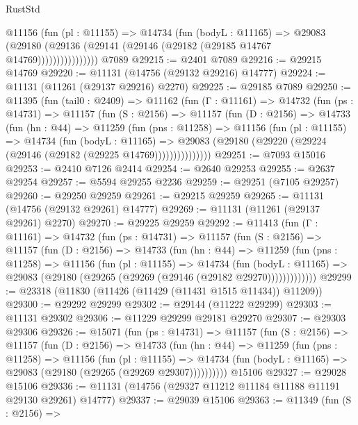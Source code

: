 \begin{lexlean}{RustStd}
\begin{coremodule}
                  @11156
                    (fun (pl : @11155) =>
                    @14734
                      (fun (bodyL : @11165) =>
                      @29083
                        (@29180
                          (@29136 (@29141 (@29146 (@29182 (@29185 @14767 @14769))))))))))))))))
    @7089
@29215 := @2401 @7089
@29216 := @29215 @14769
@29220 := @11131 (@14756 (@29132 @29216) @14777)
@29224 := @11131 (@11261 (@29137 @29216) @2270)
@29225 := @29185 @7089
@29250 := @11395
    (fun (tail0 : @2409) =>
    @11162
      (fun (Γ : @11161) =>
      @14732
        (fun (ps : @14731) =>
        @11157
          (fun (S : @2156) =>
          @11157
            (fun (D : @2156) =>
            @14733
              (fun (hn : @44) =>
              @11259
                (fun (pns : @11258) =>
                @11156
                  (fun (pl : @11155) =>
                  @14734
                    (fun (bodyL : @11165) =>
                    @29083 (@29180 (@29220 (@29224 (@29146 (@29182 (@29225 @14769)))))))))))))))
@29251 := @7093 @15016
@29253 := @2410 @7126 @2414
@29254 := @2640 @29253
@29255 := @2637 @29254
@29257 := @5594 @29255 @2236
@29259 := @29251 (@7105 @29257)
@29260 := @29250 @29259
@29261 := @29215 @29259
@29265 := @11131 (@14756 (@29132 @29261) @14777)
@29269 := @11131 (@11261 (@29137 @29261) @2270)
@29270 := @29225 @29259
@29292 := @11413
    (fun (Γ : @11161) =>
    @14732
      (fun (ps : @14731) =>
      @11157
        (fun (S : @2156) =>
        @11157
          (fun (D : @2156) =>
          @14733
            (fun (hn : @44) =>
            @11259
              (fun (pns : @11258) =>
              @11156
                (fun (pl : @11155) =>
                @14734
                  (fun (bodyL : @11165) =>
                  @29083 (@29180 (@29265 (@29269 (@29146 (@29182 @29270)))))))))))))
@29299 := @23318 (@11830 (@11426 (@11429 (@11431 @1515 @11434)) @11209))
@29300 := @29292 @29299
@29302 := @29144 (@11222 @29299)
@29303 := @11131 @29302
@29306 := @11229 @29299 @29181 @29270
@29307 := @29303 @29306
@29326 := @15071
    (fun (ps : @14731) =>
    @11157
      (fun (S : @2156) =>
      @11157
        (fun (D : @2156) =>
        @14733
          (fun (hn : @44) =>
          @11259
            (fun (pns : @11258) =>
            @11156
              (fun (pl : @11155) =>
              @14734 (fun (bodyL : @11165) => @29083 (@29180 (@29265 (@29269 @29307))))))))))
    @15106
@29327 := @29028 @15106
@29336 := @11131 (@14756 (@29327 @11212 @11184 @11188 @11191 @29130 @29261) @14777)
@29337 := @29039 @15106
@29363 := @11349
    (fun (S : @2156) =>

\end{coremodule}
\end{lexlean}
